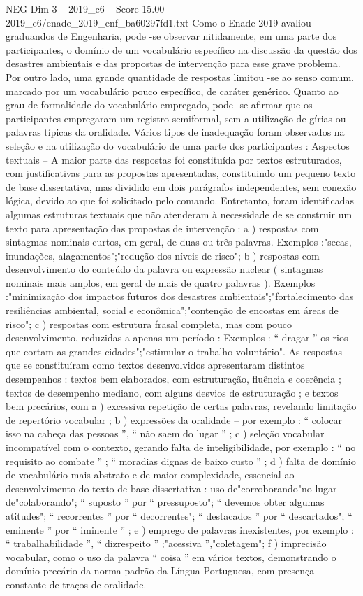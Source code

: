 \begin{textsample}{NEG Dim 3 – 2019\_c6 – Score 15.00 – 2019\_c6/enade\_2019\_enf\_ba60297fd1.txt}
Como o Enade 2019 avaliou graduandos de Engenharia, pode -se observar nitidamente, em uma parte dos participantes, o domínio de um vocabulário específico na discussão da questão dos desastres ambientais e das propostas de intervenção para esse grave problema.
Por outro lado, uma grande quantidade de respostas limitou -se ao senso comum, marcado por um vocabulário pouco específico, de caráter genérico.
Quanto ao grau de formalidade do vocabulário empregado, pode -se afirmar que os participantes empregaram um registro semiformal, sem a utilização de gírias ou palavras típicas da oralidade.
Vários tipos de inadequação foram observados na seleção e na utilização do vocabulário de uma parte dos participantes : Aspectos textuais – A maior parte das respostas foi constituída por textos estruturados, com justificativas para as propostas apresentadas, constituindo um pequeno texto de base dissertativa, mas dividido em dois parágrafos independentes, sem conexão lógica, devido ao que foi solicitado pelo comando.
Entretanto, foram identificadas algumas estruturas textuais que não atenderam à necessidade de se construir um texto para apresentação das propostas de intervenção : a ) respostas com sintagmas nominais curtos, em geral, de duas ou três palavras.
Exemplos :"secas, inundações, alagamentos";"redução dos níveis de risco"; b ) respostas com desenvolvimento do conteúdo da palavra ou expressão nuclear ( sintagmas nominais mais amplos, em geral de mais de quatro palavras ).
Exemplos :"minimização dos impactos futuros dos desastres ambientais";"fortalecimento das resiliências ambiental, social e econômica";"contenção de encostas em áreas de risco"; c ) respostas com estrutura frasal completa, mas com pouco desenvolvimento, reduzidas a apenas um período : Exemplos : “ dragar ” os rios que cortam as grandes cidades";"estimular o trabalho voluntário".
As respostas que se constituíram como textos desenvolvidos apresentaram distintos desempenhos : textos bem elaborados, com estruturação, fluência e coerência ; textos de desempenho mediano, com alguns desvios de estruturação ; e textos bem precários, com a ) excessiva repetição de certas palavras, revelando limitação de repertório vocabular ; b ) expressões da oralidade – por exemplo : “ colocar isso na cabeça das pessoas ”, “ não saem do lugar ” ; c ) seleção vocabular incompatível com o contexto, gerando falta de inteligibilidade, por exemplo : “ no requisito ao combate ” ; “ moradias dignas de baixo custo ” ; d ) falta de domínio de vocabulário mais abstrato e de maior complexidade, essencial ao desenvolvimento do texto de base dissertativa : uso de"corroborando"no lugar de"colaborando"; “ suposto ” por “ pressuposto"; “ devemos obter algumas atitudes"; “ recorrentes ” por “ decorrentes"; “ destacados ” por “ descartados"; “ eminente ” por “ iminente ” ; e ) emprego de palavras inexistentes, por exemplo : “ trabalhabilidade ”, “ dizrespeito ” ;"acessiva ”,"coletagem"; f ) imprecisão vocabular, como o uso da palavra “ coisa ” em vários textos, demonstrando o domínio precário da norma-padrão da Língua Portuguesa, com presença constante de traços de oralidade.

\end{textsample}
